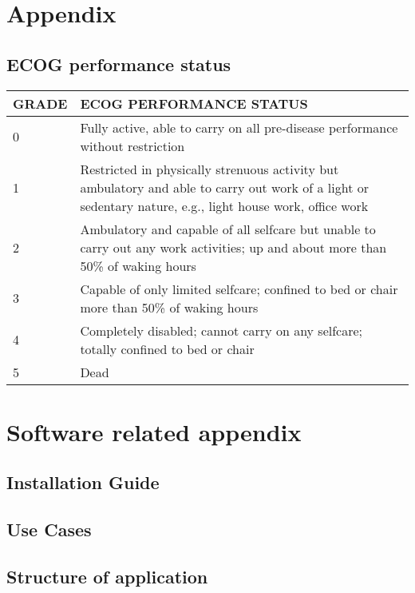 
\section{Appendix}

\subsection{ECOG performance status}


\begin{tabular}{|l p{8cm}|}
\hline
GRADE&	ECOG PERFORMANCE STATUS\\
\hline\hline
0	&Fully active, able to carry on all pre-disease performance without restriction\\
1	&Restricted in physically strenuous activity but ambulatory and able to carry out work of a light or sedentary nature, e.g., light house work, office work\\
2	&Ambulatory and capable of all selfcare but unable to carry out any work activities; up and about more than 50\% of waking hours\\
3	&Capable of only limited selfcare; confined to bed or chair more than 50\% of waking hours\\
4	&Completely disabled; cannot carry on any selfcare; totally confined to bed or chair\\
5	&Dead\\
\hline
\end{tabular}
\label{tab:ecog}


\section{Software related appendix}
\subsection{Installation Guide}
\label{app:installation}

\subsection{Use Cases}
\label{app:use_cases}

\subsection{Structure of application}
\label{app:structure}
